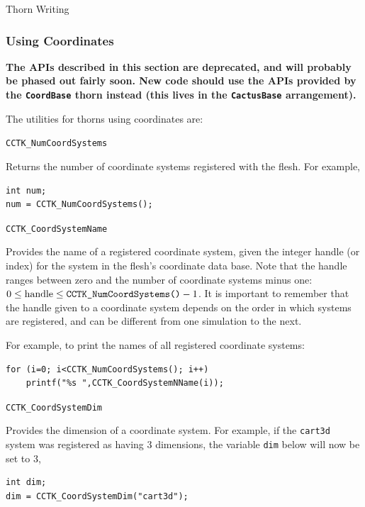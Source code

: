 \begin{cactuspart}{Thorn Writing}
\begin{Lentry}
\end{Lentry}

\subsubsection{Using Coordinates}

\textbf{The APIs described in this section are deprecated, and will
probably be phased out fairly soon.
New code should use the APIs provided by the \texttt{CoordBase} thorn
instead (this lives in the \texttt{CactusBase} arrangement).}

The utilities for thorns using coordinates are:

\begin{Lentry}

\item[\texttt{CCTK\_NumCoordSystems}]

Returns the number of coordinate systems registered with the flesh. For example,
%
\begin{verbatim}
int num;
num = CCTK_NumCoordSystems();
\end{verbatim}

\item[\texttt{CCTK\_CoordSystemName}]

Provides the name of a registered coordinate system, given the integer
handle (or index) for the system in the flesh's coordinate data base.
Note that the handle ranges between zero and the number of coordinate systems minus one: $0 \le \mbox{handle} \le \mbox{\texttt{CCTK\_NumCoordSystems()}}-1$.
It is important to remember that the handle given to a coordinate system
depends on the order in which systems are registered, and can be different
from one simulation to the next.

For example, to print the names of all registered coordinate systems:
%
\begin{verbatim}
for (i=0; i<CCTK_NumCoordSystems(); i++)
    printf("%s ",CCTK_CoordSystemNName(i));
\end{verbatim}

\item[\texttt{CCTK\_CoordSystemDim}]

Provides the dimension of a coordinate system. For example, if
the \texttt{cart3d} system was registered as having 3 dimensions, the
variable \texttt{dim} below will now be set to 3,
%
\begin{verbatim}
int dim;
dim = CCTK_CoordSystemDim("cart3d");
\end{verbatim}


\end{Lentry}
\end{cactuspart}
